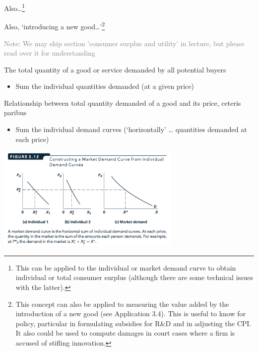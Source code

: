 \documentclass[]{article}
\providecommand{\tightlist}{%
  \setlength{\itemsep}{0pt}\setlength{\parskip}{0pt}}
\begin{document}
Also\ldots{}\footnote{This can be applied to the individual or market
  demand curve to obtain individual or total consumer surplus (although
  there are some technical issues with the latter).}

Also, `introducing a new good\ldots{}'\footnote{This concept can also be
  applied to measuring the value added by the introduction of a new good
  (see Application 3.4). This is useful to know for policy, particular
  in formulating subsidies for R\&D and in adjusting the CPI. It also
  could be used to compute damages in court cases where a firm is
  accused of stifling innovation.}

\textcolor{gray}{Note: We may skip section 'consumer surplus and utility' in lecture, but please read over it for understanding}

\bigskip

\begin{description}
\tightlist
\item[Market demand]
The total quantity of a good or service demanded by all potential buyers
\end{description}

\begin{itemize}
\tightlist
\item
  Sum the individual quantities demanded (at a given price)
\end{itemize}

\bigskip

\begin{description}
\tightlist
\item[Market demand curve]
Relationship between total quantity demanded of a good and its price,
ceteris paribus
\end{description}

\begin{itemize}
\tightlist
\item
  Sum the individual demand curves (`horizontally' \ldots{} quantities
  demanded at each price)
\end{itemize}

\includegraphics[height=2in]{picsfigs/summarketdemandcurve.png}
\end{document}
